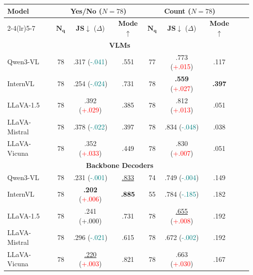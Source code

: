\begin{table}[t]
\centering
\small
\setlength{\tabcolsep}{2.2pt}
\renewcommand{\arraystretch}{0.95}

\begin{tabular}{lcccc@{\hspace{6pt}}cccc}
\toprule
\multirow{2}{*}{\textbf{Model}} &
\multicolumn{3}{c}{\textbf{Yes/No} ($N{=}78$)} &
\multicolumn{3}{c}{\textbf{Count} ($N{=}78$)} \\
\cmidrule(lr){2-4}\cmidrule(lr){5-7}
& $\mathbf{N_q}$ & \textbf{JS}$\downarrow$ ($\Delta$) & \textbf{Mode}$\uparrow$ & $\mathbf{N_q}$ & \textbf{JS}$\downarrow$ ($\Delta$) & \textbf{Mode}$\uparrow$ \\
\midrule
\multicolumn{7}{c}{\textbf{VLMs}} \\
\midrule
Qwen3-VL & 78 & .317 {\scriptsize (\textcolor{teal}{-.041})} & .551 & 77 & .773 {\scriptsize (\textcolor{red}{+.015})} & .117 \\
InternVL & 78 & .254 {\scriptsize (\textcolor{teal}{-.024})} & .731 & 78 & \textbf{.559} {\scriptsize (\textcolor{red}{+.027})} & \textbf{.397} \\
LLaVA-1.5 & 78 & .392 {\scriptsize (\textcolor{red}{+.029})} & .385 & 78 & .812 {\scriptsize (\textcolor{red}{+.013})} & .051 \\
LLaVA-Mistral & 78 & .378 {\scriptsize (\textcolor{teal}{-.022})} & .397 & 78 & .834 {\scriptsize (\textcolor{teal}{-.048})} & .038 \\
LLaVA-Vicuna & 78 & .352 {\scriptsize (\textcolor{red}{+.033})} & .449 & 78 & .830 {\scriptsize (\textcolor{red}{+.007})} & .051 \\
\midrule
\multicolumn{7}{c}{\textbf{Backbone Decoders}} \\
\midrule
Qwen3-VL & 78 & .231 {\scriptsize (\textcolor{teal}{-.001})} & \underline{.833} & 74 & .749 {\scriptsize (\textcolor{teal}{-.004})} & .149 \\
InternVL & 78 & \textbf{.202} {\scriptsize (\textcolor{red}{+.006})} & \textbf{.885} & 55 & .784 {\scriptsize (\textcolor{teal}{-.185})} & .182 \\
LLaVA-1.5 & 78 & .241 {\scriptsize (+.000)} & .731 & 78 & \underline{.655} {\scriptsize (\textcolor{red}{+.008})} & .192 \\
LLaVA-Mistral & 78 & .296 {\scriptsize (\textcolor{teal}{-.021})} & .615 & 78 & .672 {\scriptsize (\textcolor{teal}{-.002})} & .192 \\
LLaVA-Vicuna & 78 & \underline{.220} {\scriptsize (\textcolor{red}{+.003})} & .821 & 78 & .663 {\scriptsize (\textcolor{red}{+.030})} & .167 \\

\end{tabular}
\end{table}
